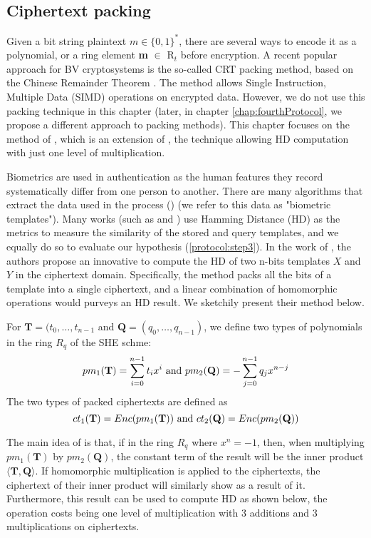 \subsection{Ciphertext packing}
\label{sub:ciphertext_packing}
Given a bit string plaintext $m \in \{0,1\}^*$, there are several ways to encode
it as a polynomial, or a ring element \textbf{m} $\in$ R$_{t}$ before
encryption. A recent popular approach for BV cryptosystems is the so-called CRT packing
method, based on the Chinese Remainder Theorem \cite{smart2014fully}. The
method allows Single Instruction, Multiple Data (SIMD) operations on encrypted
data. However, we do not use this packing technique in this chapter (later, in
chapter \ref{chap:fourthProtocol}, we propose a different approach to packing methods). This chapter focuses on the method of \cite{yasuda2014practical}, which is
an extension of \cite{naehrig2011can}, the technique allowing HD computation
with just one level of multiplication.

Biometrics are used in authentication as the human features they record
systematically differ from one person to another. There are many algorithms that
extract the data used in the process (\cite{FVConGoi2:online}) (we refer to this
data as "biometric templates"). Many works (such as \cite{daugman2003importance}
and \cite{FujitsuD7:online}) use Hamming Distance (HD) as the metrics to measure
the similarity of the stored and query templates, and we equally do so to
evaluate our hypothesis (\ref{protocol:step3}). In the work of
\cite{yasuda2014practical}, the authors propose an innovative to compute the HD
of two n-bits templates $X$ and $Y$ in the ciphertext domain. Specifically, the
method packs all the bits of a template into a single ciphertext, and a linear
combination of homomorphic operations would purveys an HD result. We sketchily
present their method below.
\begin{definition}
  For $\mathbf{T} = (t_0, \dots, t_{n-1}$ and
  $\mathbf{Q} = (q_0, \dots, q_{n-1})$, we define two types of polynomials in
  the ring $R_q$ of the SHE schme:
  \[
    pm_1(\mathbf{T}) = \sum_{i=0}^{n-1}t_ix^i \ \textnormal{and} \
    pm_2(\mathbf{Q}) = - \sum_{j=0}^{n-1}q_jx^{n-j}
  \]
  The two types of packed ciphertexts are defined as
  \[
    ct_{1}(\mathbf{T}) = Enc(pm_1(\mathbf{T})) \ \textnormal{and} \
    ct_{2}(\mathbf{Q}) = Enc(pm_2(\mathbf{Q}))
  \]
\end{definition}
The main idea of \cite{yasuda2014practical} is that, if in the ring $R_q$ where
$x^n = -1$, then, when multiplying $pm_1(\mathbf{T})$ by $pm_2(\mathbf{Q})$, the
constant term of the result will be the inner product
$\langle \mathbf{T}, \mathbf{Q}\rangle$. If homomorphic multiplication is
applied to the ciphertexts, the ciphertext of their inner product will similarly
show as a result of it. Furthermore, this result can be used to compute HD as
shown below, the operation costs being one level of multiplication with 3
additions and 3 multiplications on ciphertexts.

